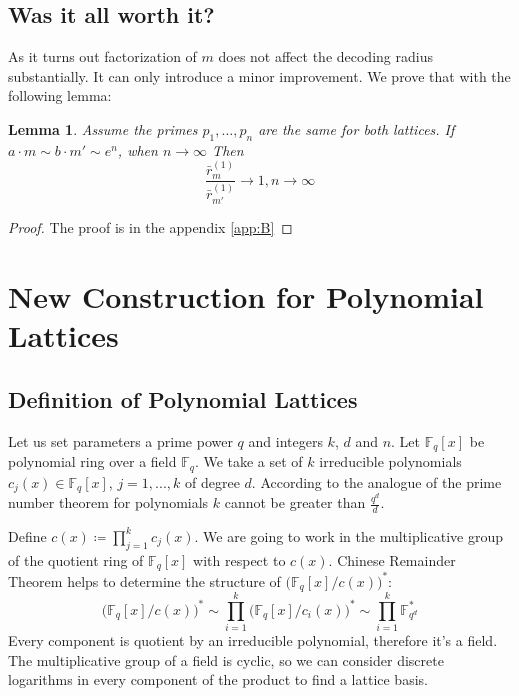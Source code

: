 \documentclass[12pt]{article}
\newcommand{\FF}{\mathbb{F}}
\newtheorem{lemma}{Lemma}
\begin{document}
\subsection{Was it all worth it?}
\label{subsec:improvement_integers}


As it turns out factorization of $m$ does not affect the decoding radius substantially. It can only introduce a minor improvement. We prove that with the following lemma:

\begin{lemma}\label{lemma:no_imrovement}
Assume the primes $p_{1}, \dots, p_{n}$ are the same for both lattices. If $a \cdot m \sim b \cdot m' \sim e^n$, when $n \rightarrow \infty$ Then
\[
    \frac{\bar r_{m}^{(1)}}{\bar r_{m'}^{(1)}} \rightarrow 1, n \rightarrow \infty
\]
\end{lemma}
\begin{proof}
    The proof is in the appendix \ref{app:B}
\end{proof}



\section{New Construction for Polynomial Lattices}
\label{sec:polynomials}



\subsection{Definition of Polynomial Lattices}
\label{subsec:def_polynomials}


Let us set parameters a prime power $q$ and integers $k$, $d$ and $n$. Let $\FF_{q}[x]$ be polynomial ring over a field  $\FF_{q}$. We take a set of $k$ irreducible polynomials $c_{j}(x) \in \FF_{q}[x]$, $j =1, ...,k$ of degree $d$. According to the analogue of the prime number theorem for polynomials $k$ cannot be greater than $\frac{q^d}{d}$.

Define $c(x) \coloneqq \prod_{j = 1}^{k} c_{j}(x)$. We are going to work in the multiplicative group of the quotient ring of  $\FF_{q}[x]$ with respect to $c(x)$.
Chinese Remainder Theorem helps to determine the structure of $\big(\FF_{q}[x]/c(x)\big)^{*}$:
\[
    \big(\FF_{q}[x]/c(x)\big)^{*} \sim \prod_{i=1}^{k}\big(\FF_{q}[x]/c_{i}(x)\big)^{*} \sim \prod_{i=1}^{k}\FF_{q^{d}}^*
\]
Every component is quotient by an irreducible polynomial, therefore it's a field. The multiplicative group of a field is cyclic, so we can consider discrete logarithms in every component of the product to find a lattice basis.
\end{document}
